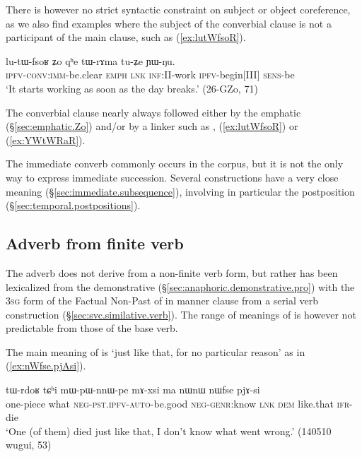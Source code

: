 There is however no strict syntactic constraint on subject or object coreference, as we also find examples where the subject of the converbial clause is not a participant of the main clause, such as (\ref{ex:lutWfsoR}). 

\begin{exe}
\ex \label{ex:lutWfsoR} 
\gll  lu-tɯ-fsoʁ ʑo qʰe tɯ-rɤma tu-ʑe ɲɯ-ŋu. \\
\textsc{ipfv}-\textsc{conv}:\textsc{imm}-be.clear \textsc{emph} \textsc{lnk} \textsc{inf}:\textsc{II}-work \textsc{ipfv}-begin[III] \textsc{sens}-be \\
\glt `It starts working as soon as the day breaks.' (26-GZo, 71)
\end{exe}

The converbial clause nearly always followed either by the emphatic  (§\ref{sec:emphatic.Zo}) and/or by a linker such as ,  (\ref{ex:lutWfsoR}) or  (\ref{ex:YWtWRaR}).

The immediate converb commonly occurs in the corpus, but it is not the only way to express immediate succession. Several constructions have a very close meaning (§\ref{sec:immediate.subsequence}), involving in particular the postposition  (§\ref{sec:temporal.postpositions}).

\subsection{Adverb from finite verb} \label{sec:nWfse}
The adverb  does not derive from a non-finite verb form, but rather has been lexicalized from the demonstrative  (§\ref{sec:anaphoric.demonstrative.pro}) with the \textsc{3sg} form of the Factual Non-Past of  in manner clause from a serial verb construction (§\ref{sec:svc.similative.verb}). The range of meanings of  is however not predictable from those of the base verb.

The main meaning of  is `just like that, for no particular reason' as in (\ref{ex:nWfse.pjAsi}). 
\begin{exe}
\ex \label{ex:nWfse.pjAsi}
\gll  tɯ-rdoʁ tɕʰi mɯ-pɯ-nnɯ-pe mɤ-xsi ma nɯnɯ nɯfse pjɤ-si \\
one-piece what \textsc{neg}-\textsc{pst}.\textsc{ipfv}-\textsc{auto}-be.good \textsc{neg}-\textsc{genr}:know \textsc{lnk} \textsc{dem} like.that \textsc{ifr}-die \\
\glt `One (of them) died just like that, I don't know what went wrong.' (140510 wugui, 53)
\end{exe}  

